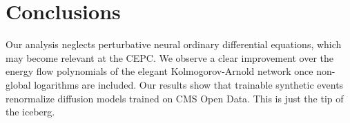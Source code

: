 \section{Conclusions}\label{sec:conclusions}

Our analysis neglects perturbative neural ordinary differential
equations, which may become relevant at the CEPC. We observe a clear
improvement over the energy flow polynomials of the elegant
Kolmogorov-Arnold network once non-global logarithms are included. Our
results show that trainable synthetic events renormalize diffusion
models trained on CMS Open Data. This is just the tip of the iceberg.

